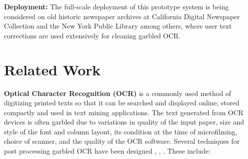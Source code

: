 \documentclass[10pt, conference, compsocconf]{IEEEtran}
\begin{document}


\noindent \textbf{Deployment: }The full-scale deployment of this prototype system is being considered on old historic newspaper archives at California Digital Newspaper Collection and the New York Public Library among others, where  user text corrections are used extensively for cleaning garbled OCR. 

\section{Related Work}
\label{sec:related}
\noindent \textbf{Optical Character Recognition (OCR)} is a commonly used method of digitizing printed texts so that it can be searched and displayed online, stored compactly and used in text mining applications. The text generated from OCR devices is often garbled due to variations in quality of the input paper, size and style of the font and column layout, its condition at the time of microfilming, choice of scanner, and the quality of the OCR software. Several techniques for post processing garbled OCR have been designed \cite{Fujisawa_08}, \cite{Esakov_94}, \cite{Lecun_90}. These include:
\end{document}
